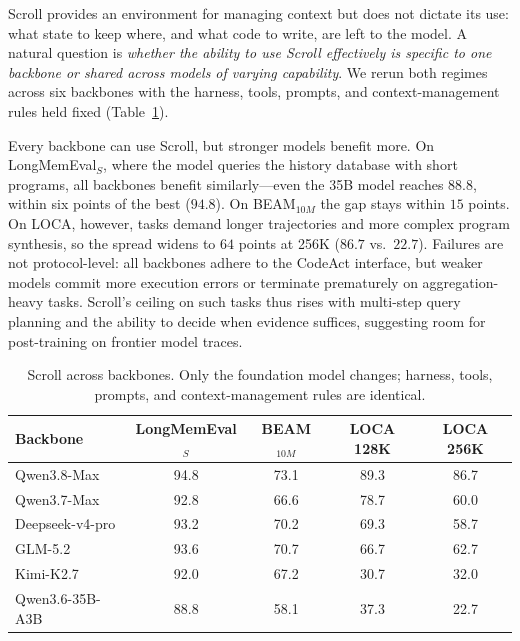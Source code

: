 Scroll provides an environment for managing context but does not dictate its use: what state to keep where, and what code to write, are left to the model. A natural question is \emph{whether the ability to use Scroll effectively is specific to one backbone or shared across models of varying capability}. We rerun both regimes across six backbones with the harness, tools, prompts, and context-management rules held fixed (Table~\ref{tab:backbone}).

Every backbone can use Scroll, but stronger models benefit more. On LongMemEval$_S$, where the model queries the history database with short programs, all backbones benefit similarly---even the 35B model reaches $88.8$, within six points of the best ($94.8$). On BEAM$_{10M}$ the gap stays within $15$ points. 
On LOCA, however, tasks demand longer trajectories and
more complex program synthesis, so the spread widens to $64$ points at 256K
($86.7$ vs.\ $22.7$). Failures are not protocol-level: all backbones adhere to the CodeAct interface, but weaker models commit more execution errors or terminate prematurely on aggregation-heavy tasks. Scroll's ceiling on such tasks thus rises with multi-step query planning and the ability to decide when evidence suffices, suggesting room for post-training on frontier model traces.


\begin{table}[t]
\centering
\caption{Scroll across backbones. Only the foundation model changes; harness,
tools, prompts, and context-management rules are identical.}
\label{tab:backbone}
\small
\begin{tabular}{lcccc}
\toprule
Backbone & LongMemEval$_S$ & BEAM$_{10M}$ & LOCA 128K & LOCA 256K \\
\midrule
Qwen3.8-Max      & 94.8 & 73.1 &89.3 & 86.7 \\
Qwen3.7-Max      & 92.8 & 66.6 &78.7 & 60.0 \\
Deepseek-v4-pro  & 93.2 & 70.2 &69.3 & 58.7 \\
GLM-5.2          & 93.6 & 70.7 &66.7 & 62.7 \\
Kimi-K2.7        & 92.0 & 67.2 &30.7 & 32.0 \\
Qwen3.6-35B-A3B  & 88.8 & 58.1 & 37.3 & 22.7 \\
\bottomrule
\end{tabular}
\end{table}



